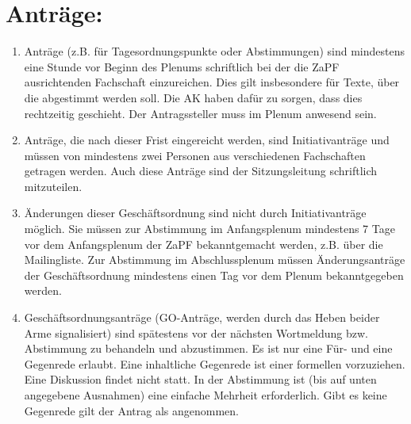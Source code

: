 \noindent
\section{Anträge:}
\begin{enumerate}
\item{Anträge (z.B. für Tagesordnungspunkte oder Abstimmungen) sind mindestens eine Stunde vor
Beginn des Plenums schriftlich bei der die ZaPF ausrichtenden Fachschaft einzureichen. Dies gilt
insbesondere für Texte, über die abgestimmt werden soll. Die AK haben dafür zu sorgen, dass dies
rechtzeitig geschieht. Der Antragssteller muss im Plenum anwesend sein.}

\item{Anträge, die nach dieser Frist eingereicht werden, sind Initiativanträge und müssen von mindestens
zwei Personen aus verschiedenen Fachschaften getragen werden. Auch diese Anträge sind der
Sitzungsleitung schriftlich mitzuteilen.}

\item{Änderungen dieser Geschäftsordnung sind nicht durch Initiativanträge möglich. Sie müssen zur
Abstimmung im Anfangsplenum mindestens 7 Tage vor dem Anfangsplenum
der ZaPF bekanntgemacht werden, z.B. über die Mailingliste. Zur
Abstimmung im Abschlussplenum müssen Änderungsanträge der
Geschäftsordnung mindestens einen Tag vor dem Plenum bekanntgegeben
werden.}

\item{Geschäftsordnungsanträge (GO-Anträge, werden durch das Heben beider Arme signalisiert) sind spätestens
vor der nächsten Wortmeldung bzw. Abstimmung zu behandeln und
abzustimmen. Es ist nur eine Für- und eine Gegenrede erlaubt. Eine
inhaltliche Gegenrede ist einer formellen vorzuziehen. Eine
Diskussion findet nicht statt. In der Abstimmung ist (bis auf unten
angegebene Ausnahmen) eine einfache Mehrheit erforderlich. Gibt es
keine Gegenrede gilt der Antrag als angenommen.}



\end{enumerate}
